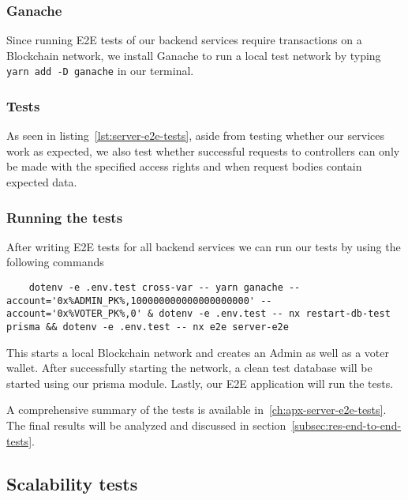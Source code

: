 \subsubsection{Ganache}

Since running \gls{E2E} tests of our backend services require transactions on a \gls{Blockchain} network, we install Ganache to run a local test network by typing \texttt{yarn add -D ganache} in our terminal.

\subsubsection{Tests}


As seen in listing~\ref{lst:server-e2e-tests}, aside from testing whether our services work as expected, we also test whether successful requests to controllers can only be made with the specified access rights and when request bodies contain expected data.

\subsubsection{Running the tests}

After writing \gls{E2E} tests for all backend services we can run our tests by using the following commands


\begin{verbatim}
    dotenv -e .env.test cross-var -- yarn ganache --account='0x%ADMIN_PK%,100000000000000000000' --account='0x%VOTER_PK%,0' & dotenv -e .env.test -- nx restart-db-test prisma && dotenv -e .env.test -- nx e2e server-e2e
\end{verbatim}

This starts a local \gls{Blockchain} network and creates an \gls{Admin} as well as a voter wallet.
After successfully starting the network, a clean test database will be started using our prisma module.
Lastly, our \gls{E2E} application will run the tests.

A comprehensive summary of the tests is available in~\cref{ch:apx-server-e2e-tests}.
The final results will be analyzed and discussed in section~\cref{subsec:res-end-to-end-tests}.

\subsection{Scalability tests}\label{subsec:scalability-tests}

